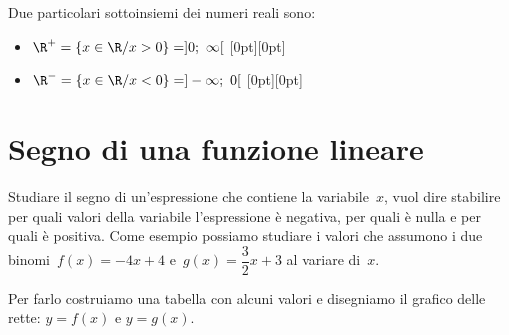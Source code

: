 \begin{esempio}{}{}
Due particolari sottoinsiemi dei numeri reali sono:

\begin{itemize} [noitemsep]
\item \(\R^{+}=\{x\in \R/x>0\} = ]0;~\infty[\) \hspace{15mm}
\raisebox{-9pt}[0pt][0pt]{} 
\item \(\R^{-}=\{x\in \R/x<0\} = ]- \infty;~0[\) \hspace{11mm}
\raisebox{-9pt}[0pt][0pt]{} 
\end{itemize}
\end{esempio}


\section{Segno di una funzione lineare}
\label{sec:dis_binomio}

Studiare il segno di un'espressione che contiene la variabile~\(x\), vuol 
dire stabilire per quali valori della variabile l'espressione è negativa, per 
quali è nulla  e per quali è positiva.
Come esempio possiamo studiare i valori che assumono i due 
binomi~\(f(x) = -4 x +4\) e~\(g(x) = \dfrac{3}{2} x +3\) al variare di~\(x\).

Per farlo costruiamo una tabella con alcuni valori e disegniamo il grafico 
delle rette: \quad \(y=f(x)\) e \(y=g(x)\).

